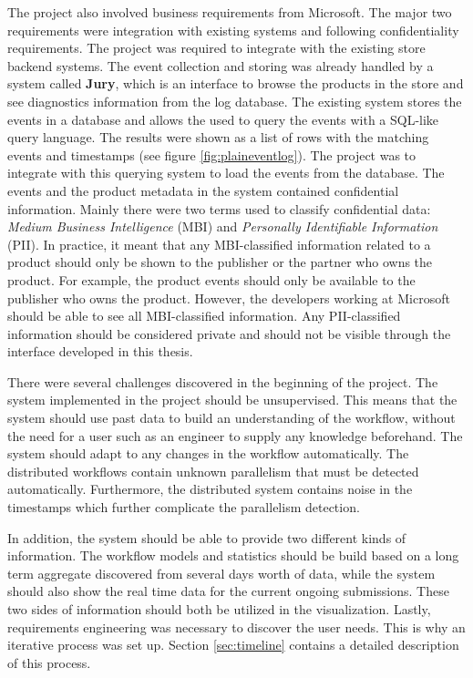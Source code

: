 
The project also involved business requirements from Microsoft. 
The major two requirements were integration with existing systems and following confidentiality requirements.
The project was required to integrate with the existing store backend systems. 
The event collection and storing was already handled by a system called \textbf{Jury}, which is an interface to browse the products in the store and see diagnostics information from the log database.
The existing system stores the events in a database and allows the used to query the events with a SQL-like query language. 
The results were shown as a list of rows with the matching events and timestamps (see figure \ref{fig:plaineventlog}). 
The project was to integrate with this querying system to load the events from the database.
The events and the product metadata in the system contained confidential information. 
Mainly there were two terms used to classify confidential data: \textit{Medium Business Intelligence} (MBI) and \textit{Personally Identifiable Information} (PII). 
In practice, it meant that any MBI-classified information related to a product should only be shown to the publisher or the partner who owns the product.
For example, the product events should only be available to the publisher who owns the product.
However, the developers working at Microsoft should be able to see all MBI-classified information.
Any PII-classified information should be considered private and should not be visible through the interface developed in this thesis. 


There were several challenges discovered in the beginning of the project.
The system implemented in the project should be unsupervised.
This means that the system should use past data to build an understanding of the workflow, without the need for a user such as an engineer to supply any knowledge beforehand.
The system should adapt to any changes in the workflow automatically.
The distributed workflows contain unknown parallelism that must be detected automatically.
Furthermore, the distributed system contains noise in the timestamps which further complicate the parallelism detection.

In addition, the system should be able to provide two different kinds of information. 
The workflow models and statistics should be build based on a long term aggregate discovered from several days worth of data,
while the system should also show the real time data for the current ongoing submissions.
These two sides of information should both be utilized in the visualization.
Lastly, requirements engineering was necessary to discover the user needs. 
This is why an iterative process was set up. 
Section \ref{sec:timeline} contains a detailed description of this process.

